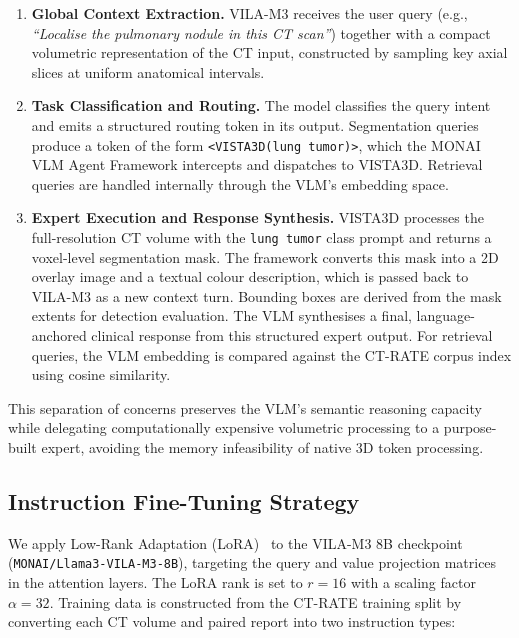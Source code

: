 \documentclass{iopconfser}
\begin{document}
\begin{enumerate}
  \item \textbf{Global Context Extraction.} VILA-M3 receives the user query
    (e.g., \textit{``Localise the pulmonary nodule in this CT scan''}) together
    with a compact volumetric representation of the CT input, constructed by
    sampling key axial slices at uniform anatomical intervals.

  \item \textbf{Task Classification and Routing.} The model classifies the
    query intent and emits a structured routing token in its output. Segmentation
    queries produce a token of the form \texttt{<VISTA3D(lung tumor)>}, which the
    MONAI VLM Agent Framework intercepts and dispatches to VISTA3D. Retrieval
    queries are handled internally through the VLM's embedding space.

  \item \textbf{Expert Execution and Response Synthesis.} VISTA3D processes the
    full-resolution CT volume with the \texttt{lung tumor} class prompt and
    returns a voxel-level segmentation mask. The framework converts this mask into
    a 2D overlay image and a textual colour description, which is passed back to
    VILA-M3 as a new context turn. Bounding boxes are derived from the mask
    extents for detection evaluation. The VLM synthesises a final,
    language-anchored clinical response from this structured expert output. For
    retrieval queries, the VLM embedding is compared against the CT-RATE corpus
    index using cosine similarity.
\end{enumerate}

This separation of concerns preserves the VLM's semantic reasoning capacity
while delegating computationally expensive volumetric processing to a
purpose-built expert, avoiding the memory infeasibility of native 3D token
processing.

\subsection{Instruction Fine-Tuning Strategy}

We apply Low-Rank Adaptation (LoRA)~\cite{lora2022} to the VILA-M3 8B
checkpoint (\texttt{MONAI/Llama3-VILA-M3-8B}), targeting the query and value
projection matrices in the attention layers. The LoRA rank is set to
$r = 16$ with a scaling factor $\alpha = 32$. Training data is constructed
from the CT-RATE training split by converting each CT volume and paired report
into two instruction types:
\end{document}
